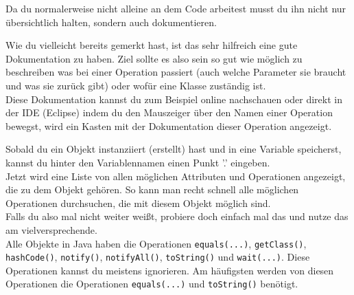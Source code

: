 \begin{Infobox}
    Da du normalerweise nicht alleine an dem Code arbeitest musst du ihn nicht nur übersichtlich halten, sondern auch dokumentieren.

    Wie du vielleicht bereits gemerkt hast, ist das sehr hilfreich eine gute Dokumentation zu haben.
    Ziel sollte es also sein so gut wie möglich zu beschreiben was bei einer Operation passiert (auch welche Parameter sie braucht und was sie zurück gibt) oder wofür eine Klasse zuständig ist.\\

    Diese Dokumentation kannst du zum Beispiel online nachschauen oder direkt in der IDE (Eclipse) indem du den Mauszeiger über den Namen einer Operation bewegst, wird ein Kasten mit der Dokumentation dieser Operation angezeigt.
\end{Infobox}

\begin{Infobox}[Autocompletion]
    Sobald du ein Objekt instanziiert (erstellt) hast und in eine Variable speicherst, kannst du hinter den Variablennamen einen Punkt '.' eingeben.\\
    Jetzt wird eine Liste von allen möglichen Attributen und Operationen angezeigt, die zu dem Objekt gehören.
    So kann man recht schnell alle möglichen Operationen durchsuchen, die mit diesem Objekt möglich sind.\\
    Falls du also mal nicht weiter weißt, probiere doch einfach mal das und nutze das am vielversprechende.\\

    Alle Objekte in Java haben die Operationen \lstinline{equals(...)}, \lstinline{getClass()}, \lstinline{hashCode()}, \lstinline{notify()}, \lstinline{notifyAll()}, \lstinline{toString()} und \lstinline{wait(...)}.
    Diese Operationen kannst du meistens ignorieren.
    Am häufigsten werden von diesen Operationen die Operationen \lstinline{equals(...)} und \lstinline{toString()} benötigt.
\end{Infobox}

